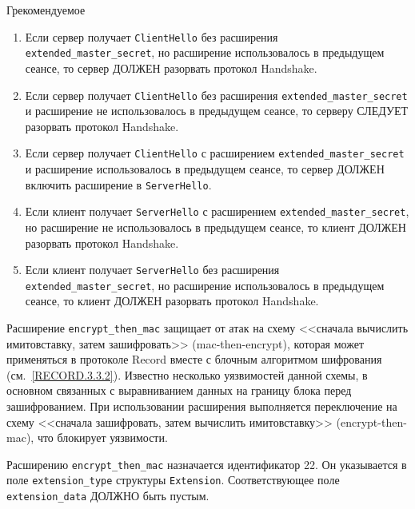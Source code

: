 \begin{appendix}{Г}{рекомендуемое}
\begin{enumerate}
\item
Если сервер получает \lstinline{ClientHello} без расширения
\lstinline{extended_master_secret}, но расширение использовалось в предыдущем 
сеансе, то сервер ДОЛЖЕН разорвать протокол Handshake.

\item
Если сервер получает \lstinline{ClientHello} без расширения
\lstinline{extended_master_secret} и расширение не использовалось в предыдущем 
сеансе, то серверу СЛЕДУЕТ разорвать протокол Handshake.

\item
Если сервер получает \lstinline{ClientHello} с расширением
\lstinline{extended_master_secret} и расширение использовалось в предыдущем 
сеансе, то сервер ДОЛЖЕН включить расширение в \lstinline{ServerHello}.

\item
Если клиент получает \lstinline{ServerHello} с расширением
\lstinline{extended_master_secret}, но расширение не использовалось в предыдущем 
сеансе, то клиент ДОЛЖЕН разорвать протокол Handshake.

\item
Если клиент получает \lstinline{ServerHello} без расширения
\lstinline{extended_master_secret}, но расширение использовалось в предыдущем 
сеансе, то клиент ДОЛЖЕН разорвать протокол Handshake.
\end{enumerate}


Расширение \lstinline{encrypt_then_mac} защищает от атак на схему <<сначала
вычислить имитовставку, затем зашифровать>> (mac-then-encrypt), которая может
применяться в протоколе Record вместе с блочным алгоритмом шифрования 
(см.~\ref{RECORD.3.3.2}). Известно несколько уязвимостей данной схемы, в 
основном связанных с выравниванием данных на границу блока перед зашифрованием.
%
При использовании расширения выполняется переключение на схему <<сначала
зашифровать, затем вычислить имитовставку>> (encrypt-then-mac), что блокирует 
уязвимости.

Расширению \lstinline{encrypt_then_mac} назначается идентификатор 22. Он
указывается в поле \lstinline{extension_type} структуры \lstinline{Extension}.
Соответствующее поле \lstinline{extension_data} ДОЛЖНО быть пустым.


\end{appendix}
